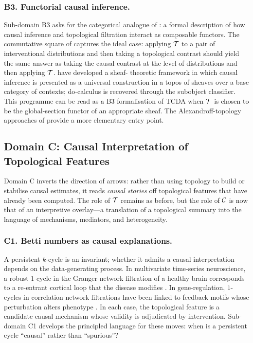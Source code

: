 \subsubsection*{B3. Functorial causal inference.}
Sub-domain B3 asks for the categorical analogue of : a
formal description of how causal inference and topological filtration
interact as composable functors. The commutative square of
 captures the ideal case: applying $\mathcal{T}$ to a pair
of interventional distributions and then taking a topological contrast
should yield the same answer as taking the causal contrast at the level
of distributions and then applying $\mathcal{T}$. \citet{mahadevan2025sheaf,
mahadevan2021causal,mahadevan2022universal} have developed a sheaf-
theoretic framework in which causal inference is presented as a
universal construction in a topos of sheaves over a base category of
contexts; do-calculus is recovered through the subobject classifier.
This programme can be read as a B3 formalisation of TCDA when $\mathcal{T}$ is
chosen to be the global-section functor of an appropriate sheaf. The
Alexandroff-topology approaches of \citet{willig2025alexandroff}
provide a more elementary entry point.



\subsection{Domain C: Causal Interpretation of Topological Features}\label{sec:domain-C}

Domain C inverts the direction of arrows: rather than using topology to
build or stabilise causal estimates, it reads \emph{causal stories} off
topological features that have already been computed. The role of $\mathcal{T}$
remains as before, but the role of $\mathcal{C}$ is now that of an interpretive
overlay---a translation of a topological summary into the language of
mechanisms, mediators, and heterogeneity.

\subsubsection*{C1. Betti numbers as causal explanations.}
A persistent $k$-cycle is an invariant; whether it admits a causal
interpretation depends on the data-generating process. In multivariate
time-series neuroscience, a robust $1$-cycle in the Granger-network
filtration of a healthy brain corresponds to a re-entrant cortical loop
that the disease modifies \citep{sizemore2018cliques,
fathian2022trend,elyaagoubi2023statistical}. In gene-regulation,
$1$-cycles in correlation-network filtrations have been linked to
feedback motifs whose perturbation alters phenotype
\citep{kovacev2016using,cang2018integration}. In each case, the
topological feature is a candidate causal mechanism whose validity is
adjudicated by intervention. Sub-domain C1 develops the principled
language for these moves: when is a persistent cycle ``causal'' rather
than ``spurious''?

